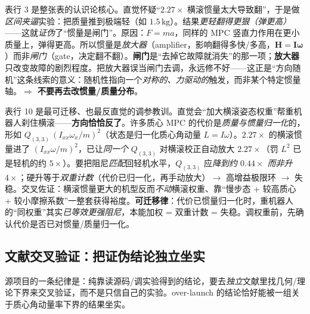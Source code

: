 \begin{insight}\label{ins:ld-gate-amp}
表行 3 是整张表的认识论核心。直觉怀疑“$2.27\times$ 横滚惯量太大导致翻”，于是做\emph{区间夹逼}实验：把质量推到极端轻（如 $1.5\,\mathrm{kg}$）。结果\emph{更轻翻得更狠（弹更高）}——这就\emph{证伪}了“惯量是闸门”。原因：$F=ma$，同样的 MPC 竖直力作用在更小质量上，弹得更高。所以惯量是\emph{放大器}（amplifier，影响翻得多快/多高，$\boldsymbol H=\boldsymbol I\boldsymbol\omega$）而非\emph{闸门}（gate，决定翻不翻）。\textbf{闸门}是“去掉它故障就消失”的那一项；\textbf{放大器}只改变故障的剧烈程度。把放大器误当闸门去调，永远修不好——这正是“方向随机”这条线索的意义：随机性指向一个\emph{对称的、力驱动的}触发，而非某个特定惯量轴。\textbf{$\Rightarrow$ 不要再去改惯量/质量分布}。
\end{insight}

\begin{insight}\label{ins:ld-weight-wrong}
表行 10 是最可迁移、也最反直觉的调参教训。直觉会“加大横滚姿态权重”帮重机器人刹住横滚——\textbf{方向恰恰反了}。许多质心 MPC 的代价是\emph{质量与惯量归一化}的，形如 $Q_{(3,3)}\,(I_{xx}\omega_x/m)^2$（状态是归一化质心角动量 $L=I\omega$）。$2.27\times$ 的横滚惯量进了 $(I_{xx}\omega/m)^2$，已让\emph{同一个} $Q_{(3,3)}$ 对横滚校正自动放大 $2.27\times$（罚 $L^2$ 已是轻机的约 $5\times$）。要把阻尼\emph{匹配}回轻机水平，$Q_{(3,3)}$ 应\emph{降到约 $0.44\times$ 而非升 $4\times$}；硬升等于\emph{双重计数}（代价已归一化，再手动放大）$\to$ 高增益极限环 $\to$ 失稳。交叉佐证：横滚惯量更大的机型反而\emph{不动}横滚权重、靠“慢步态 + 较高质心 + 较小摩擦系数”一整套获得裕度。\textbf{可迁移律}：代价已惯量归一化时，重机器人的“同权重”其实\emph{已等效更强阻尼}，本能加权 = 双重计数 = 失稳。调权重前，先确认代价是否已对惯量/质量归一化。
\end{insight}

\subsection{文献交叉验证：把证伪结论独立坐实}
\label{subsec:ld-ol-lit}

源项目的一条纪律是：纯靠读源码/调实验得到的结论，要去\emph{独立}文献里找几何/理论下界来交叉验证，而不是只信自己的实验。over-launch 的结论恰好能被一组关于质心角动量率下界的结果坐实\cite{quad2025angmombound,cam2025flight}。

